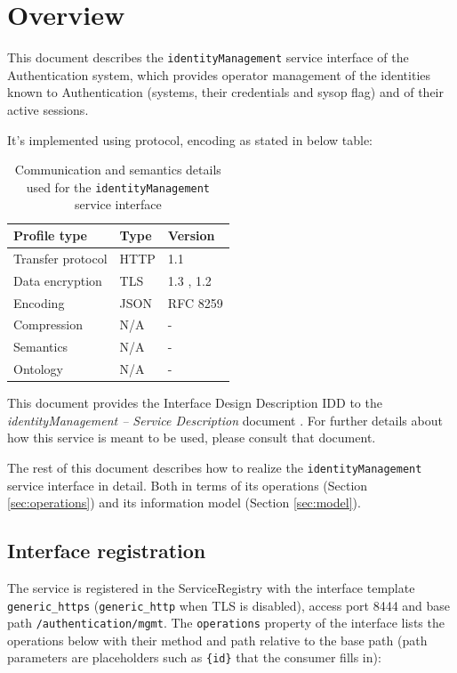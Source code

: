 \documentclass[a4paper]{arrowhead}
\begin{document}
\section{Overview}
\label{sec:overview}

This document describes the \texttt{identityManagement} service interface of the Authentication system, which provides operator management of the identities known to Authentication (systems, their credentials and sysop flag) and of their active sessions.

It's implemented using protocol, encoding as stated in below table:
\begin{table}[ht!]
  \centering
  \begin{tabular}{|l|l|l|}
    \hline
    \rowcolor{gray!33} Profile type & Type & Version \\ \hline
    Transfer protocol & HTTP & 1.1 \cite{rfc9112} \\ \hline
    Data encryption & TLS & 1.3 \cite{rfc8446}, 1.2 \cite{rfc5246} \\ \hline
    Encoding & JSON & RFC 8259 \cite{rfc8259} \\ \hline
    Compression & N/A & - \\ \hline
    Semantics & N/A & - \\ \hline
    Ontology & N/A & - \\ \hline
  \end{tabular}
  \caption{Communication and semantics details used for the \texttt{identityManagement} service interface}
  \label{tab:comunication_semantics_profile}
\end{table}

This document provides the Interface Design Description IDD to the \textit{identityManagement -- Service Description} document \cite{auth-identityManagement-sd}.
For further details about how this service is meant to be used, please consult that document.

The rest of this document describes how to realize the \texttt{identityManagement} service
interface in detail. Both in terms of its operations (Section \ref{sec:operations}) and its information model (Section \ref{sec:model}).

\subsection{Interface registration}

The service is registered in the ServiceRegistry with the interface template \texttt{generic\_\allowbreak{}https} (\texttt{generic\_\allowbreak{}http} when TLS is disabled), access port 8444 and base path \texttt{/\allowbreak{}authentication/\allowbreak{}mgmt}. The \texttt{operations} property of the interface lists the operations below with their method and path relative to the base path (path parameters are placeholders such as \texttt{\{id\}} that the consumer fills in):
\end{document}
